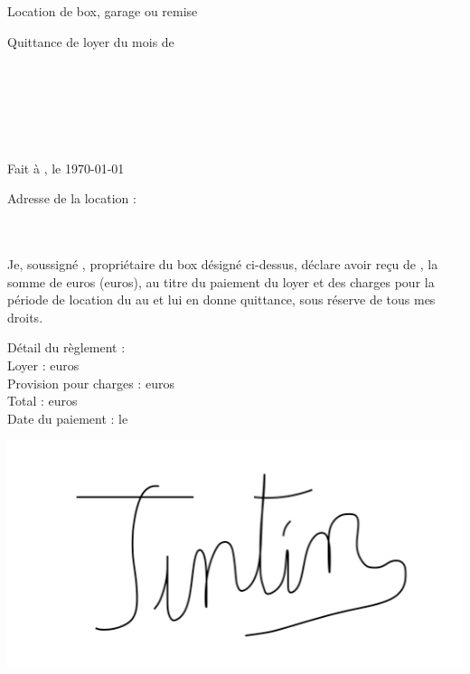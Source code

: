 \documentclass[12pt,a4paper]{article}
\begin{document}
\thispagestyle{empty}

\begin{center}
Location de box, garage ou remise\\
\begin{LARGE}
Quittance de loyer du mois de \nommois\space\annee
\end{LARGE}
\end{center}
\bigskip

\begin{flushleft}
\nomproprio\\
\adresseproprio\\
\villeproprio
\end{flushleft}

\medskip

\begin{flushright}
\nomlocataire\\
\adresselocataire\\
\villelocataire
\end{flushright}

\medskip

\begin{flushright}
Fait à \lieudocument, le \today
\end{flushright}

\medskip

\begin{flushleft}
Adresse de la location :\\
\adresselocation\\
\lotlocation\\
\villelocation
\end{flushleft}

\medskip

\begin{flushleft}
Je, soussigné \nomproprio, propriétaire du box désigné ci-dessus, déclare avoir reçu
de \nomlocataire, la somme de \totalpaiementchiffres\space euros (\totalpaiementlettres\space euros), au titre
du paiement du loyer et des charges pour la période de location du \debutmois\space au
\finmois\space et lui en donne quittance, sous réserve de tous mes droits.
\end{flushleft}

\medskip

\begin{flushleft}
Détail du règlement :\\
Loyer : \loyerchiffres\space euros\\
Provision pour charges : \charges\space euros\\
Total : \totalpaiementchiffres\space euros\\
Date du paiement : le \datepaiement
\end{flushleft}

\medskip

\begin{center}
\includegraphics[width=0.3\linewidth]{Signature.PNG}
\end{center}
\end{document}
